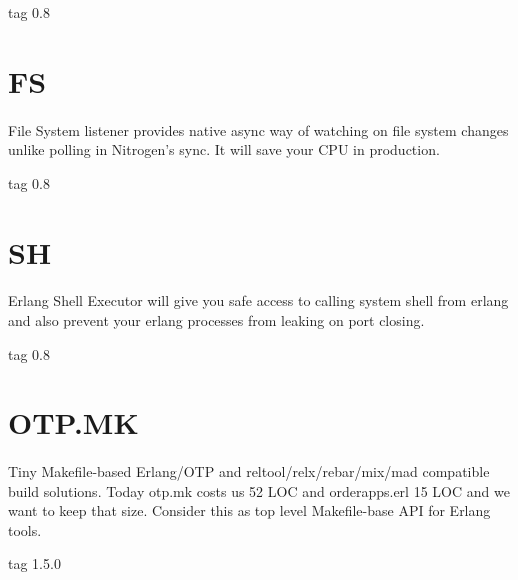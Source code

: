 \documentclass[11pt]{article}
\begin{document}
 tag 0.8

\section*{FS}
\paragraph{}
File System listener provides native async way of watching on
file system changes unlike polling in Nitrogen's sync. It will save
your CPU in production.

 tag 0.8

\section*{SH}
\paragraph{}
Erlang Shell Executor will give you safe access to calling system shell
from erlang and also prevent your erlang processes from leaking on port closing.

 tag 0.8

\section*{OTP.MK}
\paragraph{}

Tiny Makefile-based Erlang/OTP and reltool/relx/rebar/mix/mad compatible
build solutions. Today otp.mk costs us 52 LOC and orderapps.erl 15 LOC
and we want to keep that size. Consider this as top level Makefile-base
API for Erlang tools.

 tag 1.5.0
\end{document}
